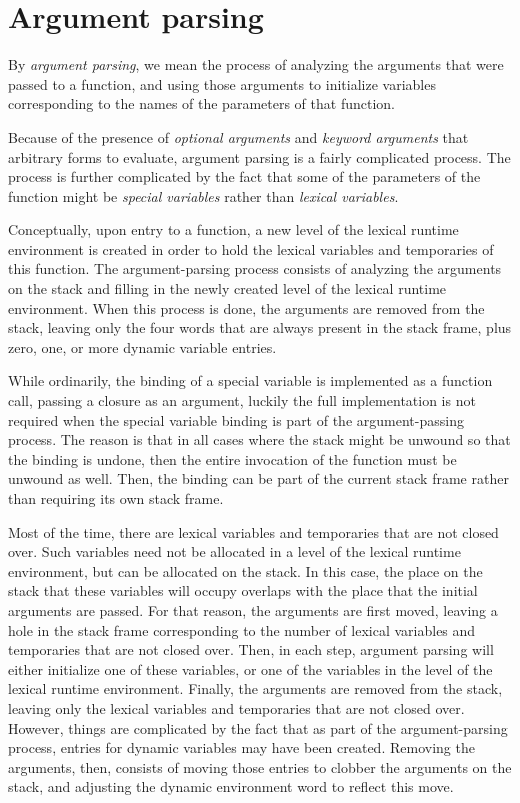 \section{Argument parsing}

By \emph{argument parsing}, we mean the process of analyzing the
arguments that were passed to a function, and using those arguments to
initialize variables corresponding to the names of the parameters of
that function.

Because of the presence of \emph{optional arguments} and \emph{keyword
  arguments} that arbitrary forms to evaluate, argument parsing is a
fairly complicated process.  The process is further complicated by the
fact that some of the parameters of the function might be
\emph{special variables} rather than \emph{lexical variables}.  

Conceptually, upon entry to a function, a new level of the lexical
runtime environment is created in order to hold the lexical variables
and temporaries of this function.  The argument-parsing process
consists of analyzing the arguments on the stack and filling in the
newly created level of the lexical runtime environment.  When this
process is done, the arguments are removed from the stack, leaving
only the four words that are always present in the stack frame, plus
zero, one, or more dynamic variable entries.

While ordinarily, the binding of a special variable is implemented as
a function call, passing a closure as an argument, luckily the full
implementation is not required when the special variable binding is
part of the argument-passing process.  The reason is that in all cases
where the stack might be unwound so that the binding is undone, then
the entire invocation of the function must be unwound as well.  Then,
the binding can be part of the current stack frame rather than
requiring its own stack frame. 

Most of the time, there are lexical variables and temporaries that are
not closed over.  Such variables need not be allocated in a level of
the lexical runtime environment, but can be allocated on the stack.
In this case, the place on the stack that these variables will occupy
overlaps with the place that the initial arguments are passed.  For
that reason, the arguments are first moved, leaving a hole in the
stack frame corresponding to the number of lexical variables and
temporaries that are not closed over.  Then, in each step, argument
parsing will either initialize one of these variables, or one of the
variables in the level of the lexical runtime environment.  Finally,
the arguments are removed from the stack, leaving only the lexical
variables and temporaries that are not closed over.  However, things
are complicated by the fact that as part of the argument-parsing
process, entries for dynamic variables may have been created.
Removing the arguments, then, consists of moving those entries to
clobber the arguments on the stack, and adjusting the dynamic
environment word to reflect this move. 

